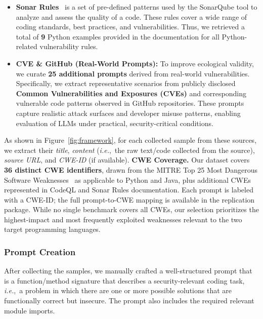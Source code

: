 \documentclass[pdflatex,sn-mathphys-ay]{sn-jnl}
\newcommand{\ie}{\textit{i.e.},\ }
\begin{document}
\begin{itemize}[leftmargin=*, label=-,noitemsep,topsep=0pt]
\item \textbf{Sonar Rules}~\cite{sonar} is a set of pre-defined patterns used by the SonarQube tool to analyze and assess the quality of a code. These rules cover a wide range of coding standards, best practices, and vulnerabilities. Thus, we retrieved a total of \textbf{9} Python examples provided in the documentation for all Python-related vulnerability rules.

\item \textbf{CVE \& GitHub (Real-World Prompts):} To improve ecological validity, we curate \textbf{25 additional prompts} derived from real-world vulnerabilities. Specifically, we extract representative scenarios from publicly disclosed \textbf{Common Vulnerabilities and Exposures (CVEs)} and corresponding vulnerable code patterns observed in GitHub repositories. These prompts capture realistic attack surfaces and developer misuse patterns, enabling evaluation of LLMs under practical, security-critical conditions.

\end{itemize}

As shown in Figure~\ref{fig:framework}, for each collected sample from these sources, we extract their \textit{title}, \textit{content} (\ie the raw text/code collected from the source), \textit{source URL}, and \textit{CWE-ID} (if available).
\textbf{CWE Coverage.} Our dataset covers \textbf{36 distinct CWE identifiers}, drawn from the MITRE Top 25 Most Dangerous Software Weaknesses~\cite{top25} as applicable to Python and Java, plus additional CWEs represented in CodeQL and Sonar Rules documentation. Each prompt is labeled with a CWE-ID; the full prompt-to-CWE mapping is available in the replication package. While no single benchmark covers all CWEs, our selection prioritizes the highest-impact and most frequently exploited weaknesses relevant to the two target programming languages.


\subsubsection{Prompt Creation}

After collecting the samples, we manually crafted a well-structured prompt that is a function/method signature that describes a security-relevant coding task, \ie a problem in which there are one or more possible solutions that are functionally correct but insecure. The prompt also includes the required relevant module imports.
\end{document}
